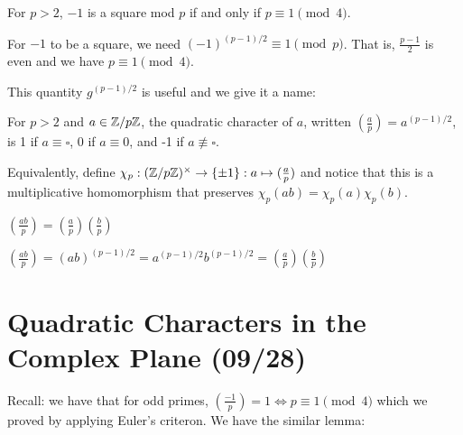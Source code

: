 \documentclass[notes]{agony}
\begin{document}
\begin{corollary}
  For $p > 2$, $-1$ is a square mod $p$ if and only if $p \equiv 1 \pmod 4$.
\end{corollary}
\begin{prf}
  For $-1$ to be a square, we need $(-1)^{(p-1)/2} \equiv 1 \pmod p$.
  That is, $\frac{p-1}{2}$ is even and we have $p \equiv 1 \pmod 4$.
\end{prf}

This quantity $g^{(p-1)/2}$ is useful and we give it a name:

\begin{defn}
  For $p > 2$ and $a \in \mathbb{Z}/p\mathbb{Z}$, the quadratic character of $a$,
  written $(\frac{a}{p}) = a^{(p-1)/2}$,
  is 1 if $a \equiv \square$, 0 if $a \equiv 0$, and -1 if $a \not\equiv \square$.

  Equivalently, define $\chi_p : (\mathbb{Z}/p\mathbb{Z})^\times \to \{\pm 1\} : a \mapsto (\frac{a}{p})$
  and notice that this is a multiplicative homomorphism that preserves $\chi_p(ab) = \chi_p(a)\chi_p(b)$.
\end{defn}

\begin{theorem}[multiplicativity]
  $(\frac{ab}{p}) = (\frac{a}{p})(\frac{b}{p})$
\end{theorem}
\begin{prf}
  $(\frac{ab}{p}) = (ab)^{(p-1)/2} = a^{(p-1)/2}b^{(p-1)/2} = (\frac{a}{p})(\frac{b}{p})$
\end{prf}

\section{Quadratic Characters in the Complex Plane (09/28)}
Recall: we have that for odd primes, $(\frac{-1}{p})=1 \iff p \equiv 1 \pmod 4$
which we proved by applying Euler's criteron.
We have the similar lemma:
\end{document}
